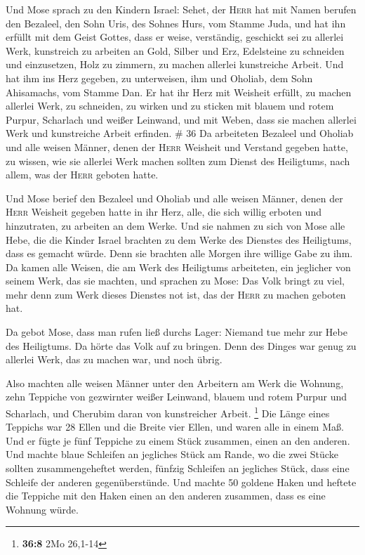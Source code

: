  Und Mose sprach zu den Kindern Israel: Sehet, der
\textsc{Herr} hat mit Namen berufen den Bezaleel, den Sohn Uris, des
Sohnes Hurs, vom Stamme Juda,  und hat ihn erfüllt mit
dem Geist Gottes, dass er weise, verständig, geschickt sei zu allerlei
Werk,  kunstreich zu arbeiten an Gold, Silber und Erz,
 Edelsteine zu schneiden und einzusetzen, Holz zu
zimmern, zu machen allerlei kunstreiche Arbeit.  Und hat
ihm ins Herz gegeben, zu unterweisen, ihm und Oholiab, dem Sohn
Ahisamachs, vom Stamme Dan.  Er hat ihr Herz mit Weisheit
erfüllt, zu machen allerlei Werk, zu schneiden, zu wirken und zu sticken
mit blauem und rotem Purpur, Scharlach und weißer Leinwand, und mit
Weben, dass sie machen allerlei Werk und kunstreiche Arbeit erfinden. \#
36  Da arbeiteten Bezaleel und Oholiab und alle weisen
Männer, denen der \textsc{Herr} Weisheit und Verstand gegeben hatte, zu
wissen, wie sie allerlei Werk machen sollten zum Dienst des Heiligtums,
nach allem, was der \textsc{Herr} geboten hatte.

 Und Mose berief den Bezaleel und Oholiab und alle weisen
Männer, denen der \textsc{Herr} Weisheit gegeben hatte in ihr Herz,
alle, die sich willig erboten und hinzutraten, zu arbeiten an dem Werke.
 Und sie nahmen zu sich von Mose alle Hebe, die die Kinder
Israel brachten zu dem Werke des Dienstes des Heiligtums, dass es
gemacht würde. Denn sie brachten alle Morgen ihre willige Gabe zu ihm.
 Da kamen alle Weisen, die am Werk des Heiligtums
arbeiteten, ein jeglicher von seinem Werk, das sie machten,
 und sprachen zu Mose: Das Volk bringt zu viel, mehr denn
zum Werk dieses Dienstes not ist, das der \textsc{Herr} zu machen
geboten hat.

 Da gebot Mose, dass man rufen ließ durchs Lager: Niemand
tue mehr zur Hebe des Heiligtums. Da hörte das Volk auf zu bringen.
 Denn des Dinges war genug zu allerlei Werk, das zu machen
war, und noch übrig.

 Also machten alle weisen Männer unter den Arbeitern am
Werk die Wohnung, zehn Teppiche von gezwirnter weißer Leinwand, blauem
und rotem Purpur und Scharlach, und Cherubim daran von kunstreicher
Arbeit. \footnote{\textbf{36:8} 2Mo 26,1-14}  Die Länge
eines Teppichs war 28 Ellen und die Breite vier Ellen, und waren alle in
einem Maß.  Und er fügte je fünf Teppiche zu einem Stück
zusammen, einen an den anderen.  Und machte blaue
Schleifen an jegliches Stück am Rande, wo die zwei Stücke sollten
zusammengeheftet werden,  fünfzig Schleifen an jegliches
Stück, dass eine Schleife der anderen gegenüberstünde. 
Und machte 50 goldene Haken und heftete die Teppiche mit den Haken einen
an den anderen zusammen, dass es eine Wohnung würde.

